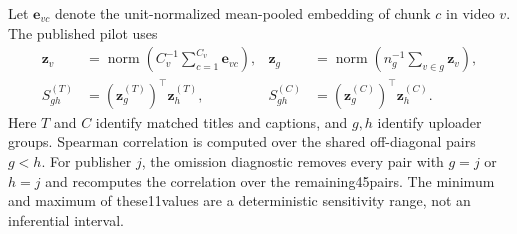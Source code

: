 Let $\mathbf e_{vc}$ denote the unit-normalized mean-pooled embedding of chunk $c$ in video $v$. The published pilot uses
\begin{align}
\mathbf z_v &= \operatorname{norm}\!\left(C_v^{-1}\sum_{c=1}^{C_v}\mathbf e_{vc}\right), &
\mathbf z_g &= \operatorname{norm}\!\left(n_g^{-1}\sum_{v\in g}\mathbf z_v\right),\\
S^{(T)}_{gh} &= (\mathbf z_g^{(T)})^\top\mathbf z_h^{(T)}, &
S^{(C)}_{gh} &= (\mathbf z_g^{(C)})^\top\mathbf z_h^{(C)}.
\end{align}
Here $T$ and $C$ identify matched titles and captions, and $g,h$ identify uploader groups. Spearman correlation is computed over the shared off-diagonal pairs $g<h$. For publisher $j$, the omission diagnostic removes every pair with $g=j$ or $h=j$ and recomputes the correlation over the remaining45pairs. The minimum and maximum of these11values are a deterministic sensitivity range, not an inferential interval.
